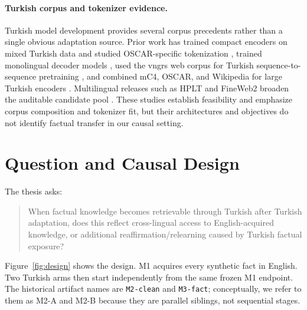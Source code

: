 \documentclass[10pt,a4paper,twocolumn]{article}
\newcommand{\mone}{M1}
\newcommand{\mta}{M2-A}
\newcommand{\mtb}{M2-B}
\begin{document}
\paragraph{Turkish corpus and tokenizer evidence.}
Turkish model development provides several corpus precedents rather than a single obvious adaptation source. Prior work has trained compact encoders on mixed Turkish data and studied OSCAR-specific tokenization \citep{kesgin2023turkishbert,toraman2023tokenization}, trained monolingual decoder models \citep{kesgin2024cosmosgpt}, used the vngrs web corpus for Turkish sequence-to-sequence pretraining \citep{turker2024vbart}, and combined mC4, OSCAR, and Wikipedia for large Turkish encoders \citep{schmitt2026sindbert}. Multilingual releases such as HPLT and FineWeb2 broaden the auditable candidate pool \citep{arefyev2024hplt,penedo2025fineweb2}. These studies establish feasibility and emphasize corpus composition and tokenizer fit, but their architectures and objectives do not identify factual transfer in our causal setting.

\section{Question and Causal Design}

The thesis asks:

\begin{quote}
When factual knowledge becomes retrievable through Turkish after Turkish adaptation, does this reflect cross-lingual access to English-acquired knowledge, or additional reaffirmation/relearning caused by Turkish factual exposure?
\end{quote}

Figure~\ref{fig:design} shows the design. \mone{} acquires every synthetic fact in English. Two Turkish arms then start independently from the same frozen \mone{} endpoint. The historical artifact names are \texttt{M2-clean} and \texttt{M3-fact}; conceptually, we refer to them as \mta{} and \mtb{} because they are parallel siblings, not sequential stages.
\end{document}

